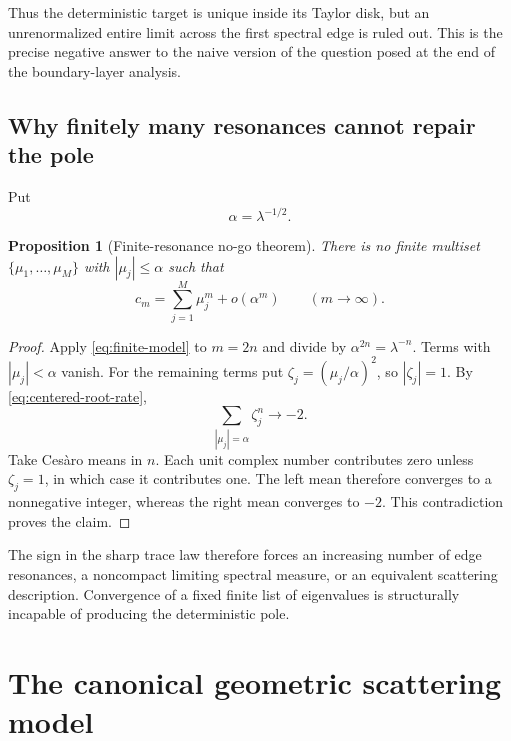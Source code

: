 \documentclass[11pt]{article}
\newtheorem{proposition}[theorem]{Proposition}
\theoremstyle{definition}
\theoremstyle{remark}
\begin{document}
Thus the deterministic target is unique inside its Taylor disk, but an
unrenormalized entire limit across the first spectral edge is ruled out.
This is the precise negative answer to the naive version of the question
posed at the end of the boundary-layer analysis.

\subsection{Why finitely many resonances cannot repair the pole}

Put
\begin{equation}\label{eq:threshold-alpha}
 \alpha=\lambda^{-1/2}.
\end{equation}

\begin{proposition}[Finite-resonance no-go theorem]
\label{prop:finite-no-go}
There is no finite multiset $\{\mu_1,\ldots,\mu_M\}$ with
$|\mu_j|\le\alpha$ such that
\begin{equation}\label{eq:finite-model}
 c_m=\sum_{j=1}^M\mu_j^m+o(\alpha^m)
 \qquad(m\to\infty).
\end{equation}
\end{proposition}

\begin{proof}
Apply \eqref{eq:finite-model} to $m=2n$ and divide by
$\alpha^{2n}=\lambda^{-n}$.  Terms with $|\mu_j|<\alpha$ vanish.  For the
remaining terms put $\zeta_j=(\mu_j/\alpha)^2$, so $|\zeta_j|=1$.
By \eqref{eq:centered-root-rate},
\begin{equation}\label{eq:unit-moment-contradiction}
 \sum_{|\mu_j|=\alpha}\zeta_j^n\longrightarrow-2.
\end{equation}
Take Ces\`aro means in $n$.  Each unit complex number contributes zero unless
$\zeta_j=1$, in which case it contributes one.  The left mean therefore
converges to a nonnegative integer, whereas the right mean converges to
$-2$.  This contradiction proves the claim.
\end{proof}

The sign in the sharp trace law therefore forces an increasing number of
edge resonances, a noncompact limiting spectral measure, or an equivalent
scattering description.  Convergence of a fixed finite list of eigenvalues
is structurally incapable of producing the deterministic pole.

\section{The canonical geometric scattering model}
\label{sec:geometric-model}
\end{document}
